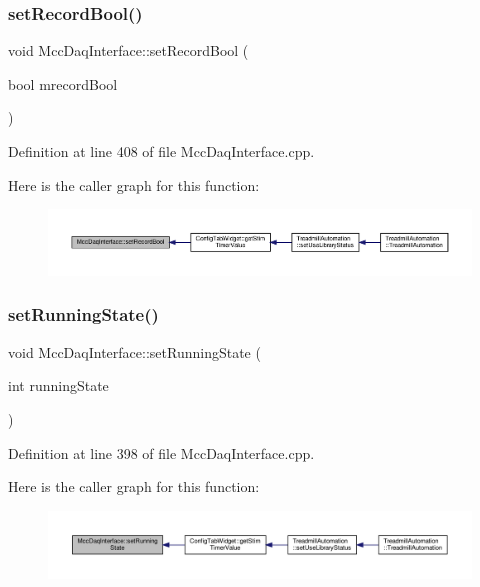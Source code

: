 \subsubsection{\texorpdfstring{set\+Record\+Bool()}{setRecordBool()}}
{\footnotesize\ttfamily void Mcc\+Daq\+Interface\+::set\+Record\+Bool (\begin{DoxyParamCaption}\item[{bool}]{mrecord\+Bool }\end{DoxyParamCaption})}



Definition at line 408 of file Mcc\+Daq\+Interface.\+cpp.

Here is the caller graph for this function\+:
\nopagebreak
\begin{figure}[H]
\begin{center}
\leavevmode
\includegraphics[width=350pt]{class_mcc_daq_interface_ae489ccc434b8f12e01cce99f3acb97bc_icgraph}
\end{center}
\end{figure}
\mbox{\label{class_mcc_daq_interface_a05186e503fb77fcecaf0748960d0d659}} 
\subsubsection{\texorpdfstring{set\+Running\+State()}{setRunningState()}}
{\footnotesize\ttfamily void Mcc\+Daq\+Interface\+::set\+Running\+State (\begin{DoxyParamCaption}\item[{int}]{running\+State }\end{DoxyParamCaption})}



Definition at line 398 of file Mcc\+Daq\+Interface.\+cpp.

Here is the caller graph for this function\+:
\nopagebreak
\begin{figure}[H]
\begin{center}
\leavevmode
\includegraphics[width=350pt]{class_mcc_daq_interface_a05186e503fb77fcecaf0748960d0d659_icgraph}
\end{center}
\end{figure}
\mbox{\label{class_mcc_daq_interface_a3036cbabc3a63737a96d0ff1fa9ce449}} 
